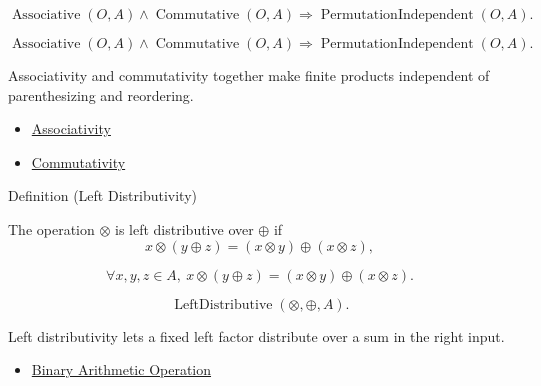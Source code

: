 \begin{remark*}
\[
\operatorname{Associative}(O,A)
\land
\operatorname{Commutative}(O,A)
\Longrightarrow
\operatorname{PermutationIndependent}(O,A).
\]
\end{remark*}

\begin{remark*}
\[
\operatorname{Associative}(O,A)
\land
\operatorname{Commutative}(O,A)
\Longrightarrow
\operatorname{PermutationIndependent}(O,A).
\]
\end{remark*}

\begin{remark*}[Interpretation]
Associativity and commutativity together make finite products independent of
parenthesizing and reordering.
\end{remark*}

\begin{dependencies}
\begin{itemize}
  \item \hyperref[def:associativity]{Associativity}
  \item \hyperref[def:commutativity]{Commutativity}
\end{itemize}
\end{dependencies}

\begin{definitionbox}{Definition (Left Distributivity)}
\begin{definition}
\label{def:left-distributivity}
The operation $\otimes$ is left distributive over $\oplus$ if
\[
x\otimes(y\oplus z)=(x\otimes y)\oplus(x\otimes z),
\]
\end{definition}
\end{definitionbox}

\begin{remark*}
\[
\forall x,y,z\in A,\ x\otimes(y\oplus z)=(x\otimes y)\oplus(x\otimes z).
\]
\end{remark*}

\begin{remark*}
\[
\operatorname{LeftDistributive}(\otimes,\oplus,A).
\]
\end{remark*}

\begin{remark*}[Interpretation]
Left distributivity lets a fixed left factor distribute over a sum in the
right input.
\end{remark*}

\begin{dependencies}
\begin{itemize}
  \item \hyperref[def:binary-arithmetic-operation]{Binary Arithmetic Operation}
\end{itemize}
\end{dependencies}

